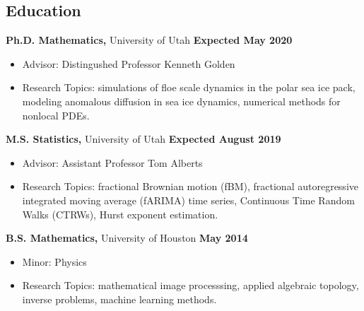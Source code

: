 \documentclass[margin,line]{res}
\begin{document}
\newcommand{\myname}{Huy Dinh}
\newlength{\mynamewidth}
\settowidth{\mynamewidth}{\namefont\myname}

\name{\hspace*{0.5\textwidth}\hspace{-0.5\mynamewidth} \myname \vspace*{.2in}}

\thispagestyle{empty}

\begin{resume}



\section{\sc Education}
{\bf Ph.D. Mathematics,} University of Utah \hfill {\bf Expected May 2020}\\
\vspace*{-.1in}
\begin{itemize} \setlength\itemsep{0em}
\item[ ] Advisor: Distingushed Professor Kenneth Golden
\item[ ] Research Topics: simulations of floe scale dynamics in the polar sea ice pack, modeling anomalous diffusion in sea ice dynamics, numerical methods for nonlocal PDEs.
\end{itemize}

{\bf M.S. Statistics,} University of Utah \hfill {\bf Expected August 2019}\\
\vspace*{-.1in}
\begin{itemize} \setlength\itemsep{0em}
\item[ ] Advisor: Assistant Professor Tom Alberts
\item[ ] Research Topics: fractional Brownian motion (fBM), fractional autoregressive integrated moving average (fARIMA) time series, Continuous Time Random Walks (CTRWs), Hurst exponent estimation.
\end{itemize}

{\bf B.S. Mathematics,} University of Houston \hfill {\bf May 2014}\\
\vspace*{-.1in}
\begin{itemize} \setlength\itemsep{0em}
\item[ ] Minor: Physics
\item[ ] Research Topics: mathematical image processsing, applied algebraic topology, inverse problems, machine learning methods.
\end{itemize}


\end{resume}
\end{document}

